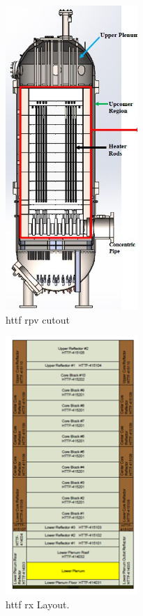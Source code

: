 \documentclass[double,12pt]{beavtex}
\begin{document}
\begin{figure}
    \begin{center}
    	\includegraphics[width=5cm]{Figures/HTTF_RPV_Cross_Section.JPG}
    	\caption{\acrshort{httf} \acrshort{rpv} cutout}
    	\label{fig:HTTF_RPV_Cutaway}
    	\end{center}
\end{figure}

\begin{figure}
    \begin{center}
    	\includegraphics[width=5cm]{Figures/HTTF_Core_Blocks}
    	\caption{\acrshort{httf} \acrshort{rx} Layout.}
    	\label{fig:HTTF_Core_Blocks}
    	\end{center}
\end{figure}
\end{document}
